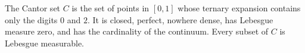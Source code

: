 The Cantor set $C$ is the set of points in $[0,1]$ whose ternary expansion contains only the digits $0$ and $2$. It is closed, perfect, nowhere dense, has Lebesgue measure zero, and has the cardinality of the continuum. Every subset of $C$ is Lebesgue measurable.
